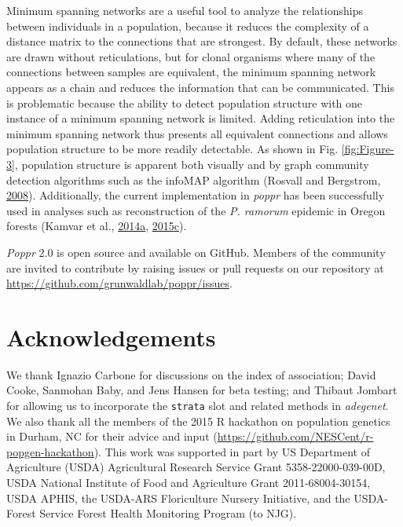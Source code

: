 \documentclass[double,12pt]{beavtex}
\begin{document}
  Minimum spanning networks are a useful tool to analyze the relationships
  between individuals in a population, because it reduces the complexity
  of a distance matrix to the connections that are strongest. By default,
  these networks are drawn without reticulations, but for clonal organisms
  where many of the connections between samples are equivalent, the
  minimum spanning network appears as a chain and reduces the information
  that can be communicated. This is problematic because the ability to
  detect population structure with one instance of a minimum spanning
  network is limited. Adding reticulation into the minimum spanning
  network thus presents all equivalent connections and allows population
  structure to be more readily detectable. As shown in Fig.
  \ref{fig:Figure-3}, population structure is apparent both visually and
  by graph community detection algorithms such as the infoMAP algorithm
  (Rosvall and Bergstrom, \protect\hyperlink{ref-rosvall2008maps}{2008}).
  Additionally, the current implementation in \emph{poppr} has been
  successfully used in analyses such as reconstruction of the \emph{P.
  ramorum} epidemic in Oregon forests (Kamvar et al.,
  \protect\hyperlink{ref-kamvar2014sudden}{2014}\protect\hyperlink{ref-kamvar2014sudden}{a},
  \protect\hyperlink{ref-kamvar2015spatial}{2015}\protect\hyperlink{ref-kamvar2015spatial}{c}).
  
  \emph{Poppr} 2.0 is open source and available on GitHub. Members of the
  community are invited to contribute by raising issues or pull requests
  on our repository at \url{https://github.com/grunwaldlab/poppr/issues}.
  
  \newpage
  
  \section{Acknowledgements}\label{acknowledgements}
  
  We thank Ignazio Carbone for discussions on the index of association;
  David Cooke, Sanmohan Baby, and Jens Hansen for beta testing; and
  Thibaut Jombart for allowing us to incorporate the \texttt{strata} slot
  and related methods in \emph{adegenet}. We also thank all the members of
  the 2015 R hackathon on population genetics in Durham, NC for their
  advice and input (\url{https://github.com/NESCent/r-popgen-hackathon}).
  This work was supported in part by US Department of Agriculture (USDA)
  Agricultural Research Service Grant 5358-22000-039-00D, USDA National
  Institute of Food and Agriculture Grant 2011-68004-30154, USDA APHIS,
  the USDA-ARS Floriculture Nursery Initiative, and the USDA-Forest
  Service Forest Health Monitoring Program (to NJG).
  
\end{document}
